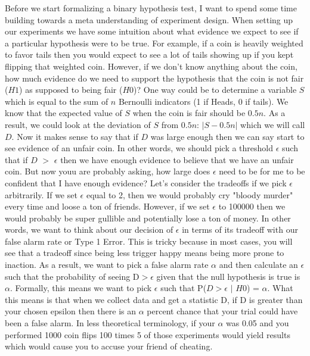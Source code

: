 \documentclass[12pt]{report}
\begin{document}
Before we start formalizing a binary hypothesis test, I want to spend some time building 
towards a meta understanding of experiment design. When setting up our experiments we have 
some intuition about what evidence we expect to see if a particular hypothesis were to be 
true. For example, if a coin is heavily weighted to favor tails then you would expect to see 
a lot of tails showing up if you kept flipping that weighted coin. 
However, if we don’t know anything about the coin, how much evidence do we need to support 
the hypothesis that the coin is not fair (\(H1\)) as supposed to being fair (\(H0\))? 
One way could be to determine a variable \(S\) which is equal to the sum of \(n\) Bernoulli 
indicators (1 if Heads, 0 if tails). We know that the expected value of \(S\) when the coin is fair should be \(0.5n\).
As a result, we could look at the deviation of \(S\) from \(0.5n\): \(|S-0.5n|\) which we will call \(D\). 
Now it makes sense to say that if \(D\) was large enough then we can say start to see evidence of an unfair coin. 
In other words, we should pick a threshold $\epsilon$ such that if \(D\) $>$ $\epsilon$ then we have enough evidence to believe
that we have an unfair coin. But now youu are probably asking, how large does $\epsilon$ need to be for me
to be confident that I have enough evidence? Let's consider the tradeoffs if we pick $\epsilon$ arbitrarily. 
If we set $\epsilon$ equal to 2, then we would probably cry "bloody murder" every time and loose a ton of 
friends. However, if we set $\epsilon$ to 100000 then we would probably be super gullible and
potentially lose a ton of money. In other words, we want to think about our decision of $\epsilon$ in terms
of its tradeoff with our false alarm rate or Type 1 Error. This is tricky because in most cases, you will see
that a tradeoff since being less trigger happy means being more prone to inaction. As a result, we want to pick
a false alarm rate $\alpha$ and then calculate an $\epsilon$ such that the probability of seeing D$>$$\epsilon$ 
given that the null hypothesis is true is $\alpha$. Formally, this means we want to pick $\epsilon$ such that 
P(\(D\)$>$$\epsilon$ $|$ \(H0\)) = $\alpha$. What this means is that when we collect data and get a statistic D, 
if D is greater than your chosen epsilon then there is an $\alpha$ percent chance that your trial could have been 
a false alarm. In less theoretical terminology, if your $\alpha$ was 0.05 and you performed 1000 coin flips 100 times
5 of those experiments would yield results which would cause you to accuse your friend of cheating.
\end{document}
